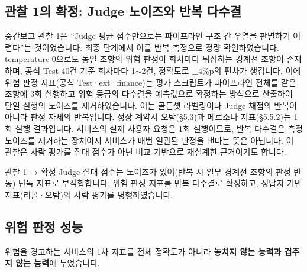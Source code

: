 \documentclass[10pt,a4paper]{article}
\begin{document}
\subsection{관찰 1의 확정: Judge 노이즈와 반복 다수결}
중간보고 관찰 1은 ``Judge 평균 점수만으로는 파이프라인 구조 간 우열을 판별하기 어렵다''는 것이었습니다. 최종 단계에서 이를 반복 측정으로 정량 확인하였습니다. temperature 0으로도 동일 조항의 위험 판정이 회차마다 뒤집히는 경계선 조항이 존재하며, 공식 Test 40건 기준 회차마다 1$\sim$2건, 정확도로 $\pm$4\%p의 편차가 생깁니다. 이에 위험 판정 지표(공식 Test·ext·finance)는 평가 스크립트가 파이프라인 전체를 같은 조항에 3회 실행하고 위험 등급의 다수결을 예측값으로 확정하는 방식으로 산출하여 단일 실행의 노이즈를 제거하였습니다. 이는 골든셋 라벨링이나 Judge 채점의 반복이 아니라 판정 자체의 반복입니다. 정상 계약서 오탐(\S5.3)과 페르소나 지표(\S5.5.2)는 1회 실행 결과입니다. 서비스의 실제 사용자 요청은 1회 실행이므로, 반복 다수결은 측정 노이즈를 제거하는 장치이지 서비스가 매번 일관된 판정을 낸다는 뜻은 아닙니다. 이 관찰은 사람 평가를 절대 점수가 아닌 비교 기반으로 재설계한 근거이기도 합니다.

\begin{obsbox}{관찰 1 → 확정}
Judge 절대 점수는 노이즈가 있어(반복 시 일부 경계선 조항의 판정 변동) 단독 지표로 부적합합니다. 위험 판정 지표를 반복 다수결로 확정하고, 정답지 기반 지표(리콜·오탐)와 사람 평가를 병행하였습니다.
\end{obsbox}

\subsection{위험 판정 성능}
위험을 경고하는 서비스의 1차 지표를 전체 정확도가 아니라 \textbf{놓치지 않는 능력과 겁주지 않는 능력}에 두었습니다.
\end{document}
